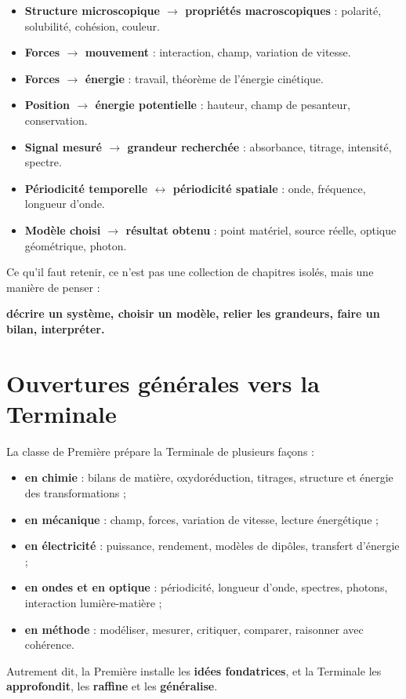 \documentclass[11pt,a4paper]{article}
\begin{document}
\begin{itemize}
    \item \textbf{Structure microscopique \(\rightarrow\) propriétés macroscopiques} : polarité, solubilité, cohésion, couleur.
    \item \textbf{Forces \(\rightarrow\) mouvement} : interaction, champ, variation de vitesse.
    \item \textbf{Forces \(\rightarrow\) énergie} : travail, théorème de l'énergie cinétique.
    \item \textbf{Position \(\rightarrow\) énergie potentielle} : hauteur, champ de pesanteur, conservation.
    \item \textbf{Signal mesuré \(\rightarrow\) grandeur recherchée} : absorbance, titrage, intensité, spectre.
    \item \textbf{Périodicité temporelle \(\leftrightarrow\) périodicité spatiale} : onde, fréquence, longueur d'onde.
    \item \textbf{Modèle choisi \(\rightarrow\) résultat obtenu} : point matériel, source réelle, optique géométrique, photon.
\end{itemize}

\begin{sensbox}
Ce qu'il faut retenir, ce n'est pas une collection de chapitres isolés, mais une manière de penser :
\begin{center}
\textbf{décrire un système, choisir un modèle, relier les grandeurs, faire un bilan, interpréter.}
\end{center}
\end{sensbox}

\section{Ouvertures générales vers la Terminale}

\begin{terminalebox}
La classe de Première prépare la Terminale de plusieurs façons :

\begin{itemize}
    \item \textbf{en chimie} : bilans de matière, oxydoréduction, titrages, structure et énergie des transformations ;
    \item \textbf{en mécanique} : champ, forces, variation de vitesse, lecture énergétique ;
    \item \textbf{en électricité} : puissance, rendement, modèles de dipôles, transfert d'énergie ;
    \item \textbf{en ondes et en optique} : périodicité, longueur d'onde, spectres, photons, interaction lumière-matière ;
    \item \textbf{en méthode} : modéliser, mesurer, critiquer, comparer, raisonner avec cohérence.
\end{itemize}

Autrement dit, la Première installe les \textbf{idées fondatrices}, et la Terminale les \textbf{approfondit}, les \textbf{raffine} et les \textbf{généralise}.
\end{terminalebox}
\end{document}
